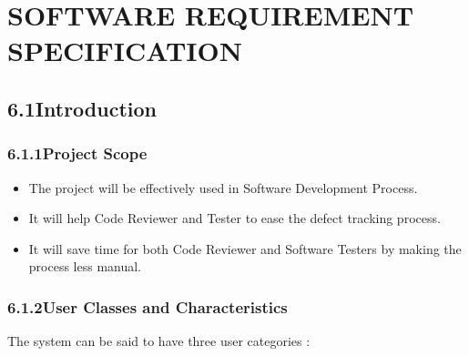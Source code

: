 \documentclass[oneside,a4paper,12pt]{book}
\begin{document}

\newpage

\chapter{SOFTWARE REQUIREMENT SPECIFICATION}


\vspace{\baselineskip}
\pagebreak


\newpage
\par
\section*{6.1\hspace*{10pt}Introduction}
\subsection*{6.1.1\hspace*{10pt}Project Scope}
\setlength{\parskip}{0.0pt}
\begin{itemize}
	\item The project will be effectively used in Software Development Process.\par

	\item It will help Code Reviewer and Tester to ease the defect tracking process.\par

\setlength{\parskip}{9.96pt}
	\item It will save time for both Code Reviewer and Software Testers by making the process less manual.
\end{itemize}\par

\vspace{\baselineskip}
\subsection*{6.1.2\hspace*{10pt}User Classes and Characteristics}
\begin{justify}
The system can be said to have three user categories :
\end{justify}\par
\end{document}
